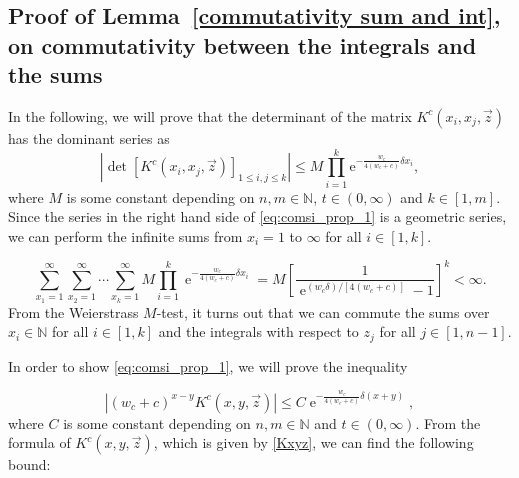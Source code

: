 \documentclass[cmp]{svjour}
\numberwithin{theorem}{section}
\numberwithin{equation}{section}
\DeclareMathOperator{\e}{e}
\begin{document}
\subsection{Proof of Lemma~\ref{commutativity sum and int}, on commutativity between the integrals and the sums}
\label{ap:commutativity}

In the following, we will prove that the determinant of the matrix $K^c(x_i , x_j , \vec{z})$ has the dominant series as
\begin{equation}
\label{eq:comsi_prop_1}
\left| \det\left[ K^c(x_i , x_j, \vec{z}) \right]_{1 \leq i , j \leq k} \right| \leq M \prod_{i=1}^{k}{ \mathrm{e}^{ - \frac{w_c}{4(w_c + c)} \delta x_i } },
\end{equation}
where $M$ is some constant depending on $n, m \in \mathbb{N}$, $t \in (0,\infty)$ and $k \in [1,m]$.
Since the series in the right hand side of \eqref{eq:comsi_prop_1} is a geometric series, we can perform the infinite sums from $x_i = 1$ to $\infty$ for all $i \in [1,k]$.

\begin{equation*}
\label{eq:comsi_prop_2}
\sum_{x_1 = 1}^{\infty}{ \sum_{x_2 = 1}^{ \infty }{ \cdots \sum_{x_k = 1}^{\infty}{ M \prod_{i=1}^{k}{ \e^{ - \frac{w_c}{4(w_c + c)} \delta x_i } } } } } = M {\left[ \frac{1}{ \e^{ (w_c \delta)/[4(w_c + c)] } - 1 } \right]}^k < \infty.
\end{equation*}
From the Weierstrass $M$-test, it turns out that we can commute the sums over $x_i \in \mathbb{N}$ for all $i \in [1,k]$ and the integrals with respect to $z_j$ for all $j \in [1,n-1]$.

In order to show \eqref{eq:comsi_prop_1}, we will prove the inequality

\begin{equation}
\label{eq:comsi_prop_3}
\left| {(w_c + c)}^{x - y} K^c(x , y , \vec{z}) \right| \leq C \e^{ - \frac{w_c}{4(w_c + c)} \delta (x + y) },
\end{equation}
where $C$ is some constant depending on $n,m \in \mathbb{N}$ and $t \in (0,\infty)$.
From the formula of $K^c(x,y,\vec{z})$, which is given by \eqref{Kxyz}, we can find the following bound:
\end{document}
